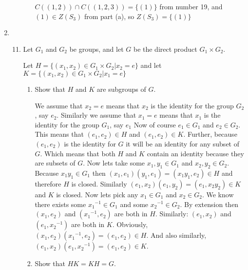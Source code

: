 \documentclass[letterpaper]{article}
\begin{document}
\begin{enumerate}
\begin{enumerate}
\begin{enumerate}
      $C((1,2))\cap C((1,2,3))=\{(1)\}$ from number 19, and $(1)\in Z(S_3)$ from part (a), so $Z(S_3)=\{(1)\}$
    \end{enumerate}
  \end{enumerate}
\item
  \begin{enumerate}
  \setcounter{enumii}{10}
  \item
    Let $G_1$ and $G_2$ be groups, and let $G$ be the direct product $G_1\times G_2$.

    Let $H=\{(x_1,x_2)\in G_1\times G_2|x_2=e\}$ and let $K=\{(x_1,x_2)\in G_1\times G_2|x_1=e\}$
    \begin{enumerate}
    \item
      Show that $H$ and $K$ are subgroups of $G$.

      We assume that $x_2=e$ means that $x_2$ is the identity for the group $G_2$, say $e_2$.
      Similarly we assume that $x_1=e$ means that $x_1$ is the identity for the group $G_1$, say $e_1$
      Now of course $e_1\in G_1$ and $e_2\in G_2$.
      This means that $(e_1,e_2)\in H$ and $(e_1,e_2)\in K$.
      Further, because $(e_1,e_2)$ is the identity for $G$ it will be an identity for any subset of $G$.
      Which means that both $H$ and $K$ contain an identity because they are subsets of $G$.
      Now lets take some $x_1,y_1\in G_1$ and $x_2,y_2\in G_2$.
      Because $x_1y_1\in G_1$ then $(x_1,e_1)(y_1,e_1)=(x_1y_1,e_2)\in H$ and therefore $H$ is closed.
      Similarly $(e_1,x_2)(e_1,y_2)=(e_1,x_2y_2)\in K$ and $K$ is closed.
      Now lets pick any $x_1\in G_1$ and $x_2\in G_2$.
      We know there exists some ${x_1}^{-1}\in G_1$ and some ${x_2}^{-1}\in G_2$. 
      By extension then $(x_1,e_2)$ and $({x_1}^{-1},e_2)$ are both in $H$.
      Similarly: $(e_1,x_2)$ and $(e_1,{x_2}^{-1})$ are both in $K$.
      Obviously, $(x_1,e_2)({x_1}^{-1},e_2)=(e_1,e_2)\in H$.
      And also similarly, $(e_1,x_2)(e_1,{x_2}^{-1})=(e_1,e_2)\in K$.
    \item
      Show that $H K=K H=G$.


\end{enumerate}
\end{enumerate}
\end{enumerate}
\end{document}
